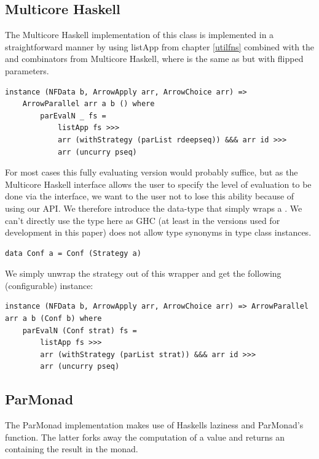\subsection{Multicore Haskell}
The Multicore Haskell implementation of this class is implemented in a straightforward manner by using listApp from chapter \ref{utilfns} combined with the  and  combinators from Multicore Haskell, where  is the same as  but with flipped parameters.
\begin{lstlisting}[frame=htrbl]
instance (NFData b, ArrowApply arr, ArrowChoice arr) =>
	ArrowParallel arr a b () where
    	parEvalN _ fs =
       		listApp fs >>>
        	arr (withStrategy (parList rdeepseq)) &&& arr id >>>
        	arr (uncurry pseq)
\end{lstlisting}%
For most cases this fully evaluating version would probably suffice, but as the Multicore Haskell interface allows the user to specify the level of evaluation to be done via the  interface, we want to the user not to lose this ability because of using our API. We therefore introduce the  data-type that simply wraps a . We can't directly use the  type here as GHC (at least in the versions used for development in this paper) does not allow type synonyms in type class instances.
\begin{lstlisting}[frame=htrbl]
data Conf a = Conf (Strategy a)
\end{lstlisting}
We simply unwrap the strategy out of this wrapper and get the following (configurable)  instance:
\begin{lstlisting}[frame=htrbl]
instance (NFData b, ArrowApply arr, ArrowChoice arr) => ArrowParallel arr a b (Conf b) where
    parEvalN (Conf strat) fs =
        listApp fs >>>
        arr (withStrategy (parList strat)) &&& arr id >>>
        arr (uncurry pseq)
\end{lstlisting}
\subsection{ParMonad}
The ParMonad implementation makes use of Haskells laziness and ParMonad's  function. The latter forks away the computation of a value and returns an  containing the result in the  monad.


